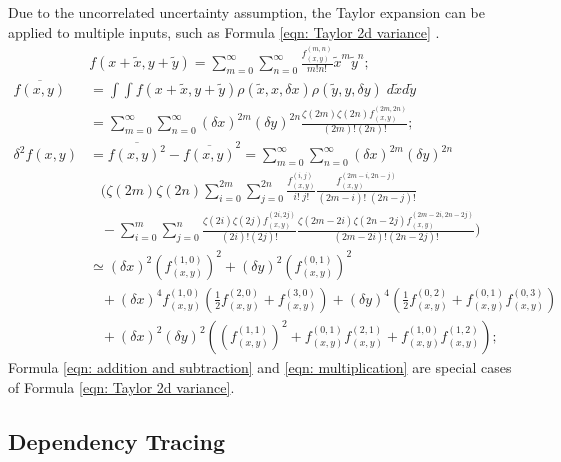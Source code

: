 \documentclass[twoside]{article}
\numberwithin{equation}{section}
\newcommand{\eqspace}{\;\;\;}
\begin{document}
Due to the uncorrelated uncertainty assumption, the Taylor expansion can be applied to multiple inputs, such as Formula \eqref{eqn: Taylor 2d variance} \cite{Prev_Precision_Arithmetic} .
\begin{align}
\label{eqn: Taylor 2d}
&f(x + \tilde{x}, y + \tilde{y}) = \sum_{m=0}^{\infty} \sum_{n=0}^{\infty} \frac{f^{(m,n)}_{(x,y)}}{m! n!} \tilde{x}^m \tilde{y}^n; \\
\label{eqn: Taylor 2d mean}
\overline{f(x,y)} &= \int \int f(x + \tilde{x}, y + \tilde{y}) \rho(\tilde{x}, x, \delta x) \rho(\tilde{y}, y, \delta y)\; d \tilde{x} d \tilde{y} \nonumber \\
&= \sum_{m=0}^{\infty} \sum_{n=0}^{\infty} (\delta x)^{2m} (\delta y)^{2n}  \frac{\zeta(2m) \zeta(2n) f^{(2m,2n)}_{(x,y)}}{(2m)! (2n)!}; \\
\label{eqn: Taylor 2d variance}
\delta^2 f(x, y) &= \overline{f(x, y)^2} - \overline{f(x, y)}^2 = \sum_{m=0}^{\infty} \sum_{n=0}^{\infty} (\delta x)^{2m} (\delta y)^{2n} \nonumber \\
&\eqspace (\zeta(2m) \zeta(2n) \sum_{i=0}^{2m} \sum_{j=0}^{2n} \frac{f^{(i,j)}_{(x,y)}}{i!\;j!}\frac{f^{(2m-i,2n-j)}_{(x,y)}}{(2m-i)!\;(2n-j)!} \nonumber \\
&\eqspace - \sum_{i=0}^{m} \sum_{j=0}^{n} \frac{\zeta(2i) \zeta(2j) f^{(2i,2j)}_{(x,y)}}{(2i)!(2j)!}\frac{\zeta(2m-2i) \zeta(2n-2j) f^{(2m-2i,2n-2j)}_{(x,y)}}{(2m-2i)!(2n-2j)!}) \\
&\simeq (\delta x)^2 (f^{(1,0)}_{(x,y)})^2 + (\delta y)^2 (f^{(0,1)}_{(x,y)})^2  \nonumber \\
&\eqspace + (\delta x)^4 f^{(1,0)}_{(x,y)} (\frac{1}{2} f^{(2,0)}_{(x,y)} + f^{(3,0)}_{(x,y)})
      + (\delta y)^4 (\frac{1}{2} f^{(0,2)}_{(x,y)} + f^{(0,1)}_{(x,y)} f^{(0,3)}_{(x,y)}) \nonumber \\
&\eqspace + (\delta x)^2 (\delta y)^2 ((f^{(1,1)}_{(x,y)})^2 + f^{(0,1)}_{(x,y)} f^{(2,1)}_{(x,y)} + f^{(1,0)}_{(x,y)} f^{(1,2)}_{(x,y)});
\end{align}
Formula \eqref{eqn: addition and subtraction} and \eqref{eqn: multiplication} are special cases of Formula \eqref{eqn: Taylor 2d variance}.


\subsection{Dependency Tracing}

\iffalse
\end{document}

